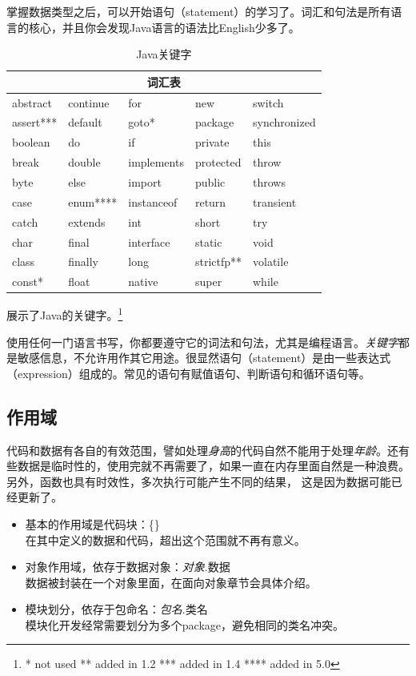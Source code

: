 掌握数据类型之后，可以开始语句（statement）的学习了。词汇和句法是所有语言的核心，并且你会发现Java语言的语法比English少多了。
\begin{table}[!htbp]\centering
\begin{tabular}{|p{2cm}|p{2cm}|p{2cm}|p{2cm}|p{2.5cm}|}
\hline
\multicolumn{5}{|c|}{词汇表}\\
\hline
abstract&continue&for&new&switch\\
assert***&default&goto*&package&synchronized\\
boolean&do&if&private&this\\
break&double&implements&protected&throw\\
byte&else&import&public&throws\\
case&enum****&instanceof&return&transient\\
catch&extends&int&short&try\\
char&final&interface&static&void\\
class&finally&long&strictfp**&volatile\\
const*&float&native&super&while\\
\hline
\end{tabular}
\caption{Java关键字}
\label{table:part1_java_keywords}
\end{table}
展示了Java的关键字。\footnote{
*       not used
**      added in 1.2
***     added in 1.4
****    added in 5.0
}

使用任何一门语言书写，你都要遵守它的词法和句法，尤其是编程语言。\emph{关键字}都是敏感信息，不允许用作其它用途。很显然语句（statement）是由一些表达式（expression）组成的。常见的语句有赋值语句、判断语句和循环语句等。

\subsection{作用域}
代码和数据有各自的有效范围，譬如处理\emph{身高}的代码自然不能用于处理\emph{年龄}。还有些数据是临时性的，使用完就不再需要了，如果一直在内存里面自然是一种浪费。另外，函数也具有时效性，多次执行可能产生不同的结果，
这是因为数据可能已经更新了。

\begin{itemize}
\item[1.]基本的作用域是代码块：\{\}\\
在其中定义的数据和代码，超出这个范围就不再有意义。
\item[2.]对象作用域，依存于数据对象：\emph{对象}.数据\\
数据被封装在一个对象里面，在面向对象章节会具体介绍。
\item[3.]模块划分，依存于包命名：\emph{包名}.类名\\
模块化开发经常需要划分为多个package，避免相同的类名冲突。
\end{itemize}

